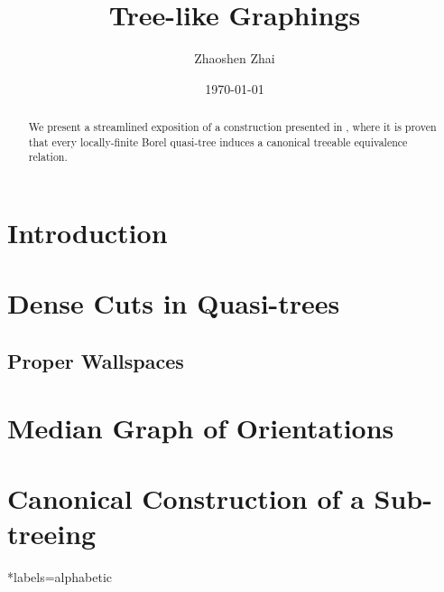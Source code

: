 \documentclass{amsart}
\begin{document}
    \title{Tree-like Graphings}
    \author{Zhaoshen Zhai}
    \date{\today}

    \begin{abstract}
        We present a streamlined exposition of a construction presented in \cite{CPTT23}, where it is proven that every locally-finite Borel quasi-tree induces a canonical treeable equivalence relation.
    \end{abstract}

    \maketitle

    \section{Introduction}

    \section{Dense Cuts in Quasi-trees}

    \subsection{Proper Wallspaces}

    \section{Median Graph of Orientations}

    \section{Canonical Construction of a Sub-treeing}

    \begin{bibdiv}
        \begin{biblist}*{labels={alphabetic}}
        \end{biblist}
    \end{bibdiv}
\end{document}
